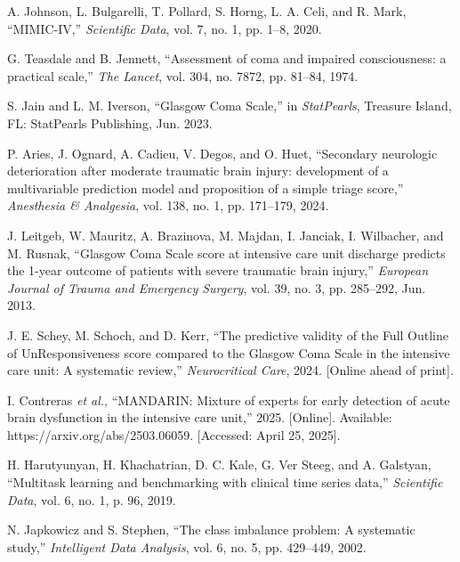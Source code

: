 \documentclass[conference]{IEEEtran}
\begin{document}
\begin{thebibliography}{00}

 A. Johnson, L. Bulgarelli, T. Pollard, S. Horng, L. A. Celi, and R. Mark, ``MIMIC-IV,'' \textit{Scientific Data}, vol. 7, no. 1, pp. 1–8, 2020.

 G. Teasdale and B. Jennett, ``Assessment of coma and impaired consciousness: a practical scale,'' \textit{The Lancet}, vol. 304, no. 7872, pp. 81–84, 1974.

 S. Jain and L. M. Iverson, ``Glasgow Coma Scale,'' in \textit{StatPearls}, Treasure Island, FL: StatPearls Publishing, Jun. 2023.

 P. Aries, J. Ognard, A. Cadieu, V. Degos, and O. Huet, ``Secondary neurologic deterioration after moderate traumatic brain injury: development of a multivariable prediction model and proposition of a simple triage score,'' \textit{Anesthesia \& Analgesia}, vol. 138, no. 1, pp. 171–179, 2024.

 J. Leitgeb, W. Mauritz, A. Brazinova, M. Majdan, I. Janciak, I. Wilbacher, and M. Rusnak, ``Glasgow Coma Scale score at intensive care unit discharge predicts the 1-year outcome of patients with severe traumatic brain injury,'' \textit{European Journal of Trauma and Emergency Surgery}, vol. 39, no. 3, pp. 285–292, Jun. 2013.

 J. E. Schey, M. Schoch, and D. Kerr, ``The predictive validity of the Full Outline of UnResponsiveness score compared to the Glasgow Coma Scale in the intensive care unit: A systematic review,'' \textit{Neurocritical Care}, 2024. [Online ahead of print].

 I. Contreras \textit{et al.}, ``MANDARIN: Mixture of experts for early detection of acute brain dysfunction in the intensive care unit,'' 2025. [Online]. Available: https://arxiv.org/abs/2503.06059. [Accessed: April 25, 2025].

 H. Harutyunyan, H. Khachatrian, D. C. Kale, G. Ver Steeg, and A. Galstyan, ``Multitask learning and benchmarking with clinical time series data,'' \textit{Scientific Data}, vol. 6, no. 1, p. 96, 2019.

 N. Japkowicz and S. Stephen, ``The class imbalance problem: A systematic study,'' \textit{Intelligent Data Analysis}, vol. 6, no. 5, pp. 429–449, 2002.


\end{thebibliography}
\end{document}
